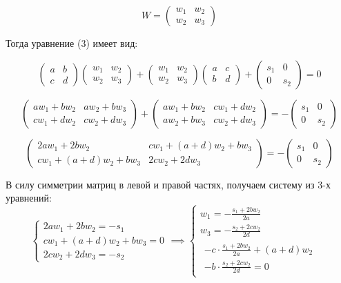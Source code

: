 $$
W = 
\begin{pmatrix}
    w_1 & w_2 \\
    w_2 & w_3
\end{pmatrix}
$$

Тогда уравнение (3) имеет вид:

$$
\begin{pmatrix}
    a & b \\
    c & d
\end{pmatrix}
\begin{pmatrix}
    w_1 & w_2 \\
    w_2 & w_3
\end{pmatrix}
+
\begin{pmatrix}
    w_1 & w_2 \\
    w_2 & w_3
\end{pmatrix}
\begin{pmatrix}
    a & c \\
    b & d
\end{pmatrix}
+
\begin{pmatrix}
    s_1 & 0 \\
    0 & s_2
\end{pmatrix}
= 0
$$

$$
\begin{pmatrix}
    a w_1 + b w_2 & a w_2 + b w_3 \\
    c w_1 + d w_2 & c w_2 + d w_3
\end{pmatrix}
+
\begin{pmatrix}
    a w_1 + b w_2 & c w_1 + d w_2 \\
    a w_2 + b w_3 & c w_2 + d w_3
\end{pmatrix}
=
- \begin{pmatrix}
    s_1 & 0 \\
    0 & s_2
\end{pmatrix}
$$

$$
\begin{pmatrix}
    2a w_1 + 2b w_2 & cw_1 + (a+d)w_2 + bw_3 \\
    cw_1 + (a+d)w_2 + bw_3 & 2c w_2 + 2d w_3
\end{pmatrix}
=
- \begin{pmatrix}
    s_1 & 0 \\
    0 & s_2
\end{pmatrix}
$$

В силу симметрии матриц в левой и правой частях, получаем систему из 3-х уравнений:
$$
\begin{cases}
   2a w_1 + 2b w_2 = -s_1 \\
   c w_1 + (a+d) w_2 + b w_3 = 0 \\
   2c w_2 + 2d w_3 = -s_2
\end{cases}
\implies
\begin{cases}
    w_1 = -\frac{s_1 + 2b w_2}{2a} \\
    w_3 = -\frac{s_2 + 2c w_2}{2d} \\
    \begin{aligned}
        -c \cdot \frac{s_1 + 2b w_2}{2a} + (a + d) w_2 & \\
        - b \cdot \frac{s_2 + 2c w_2}{2d} = 0
    \end{aligned}
\end{cases}
$$

